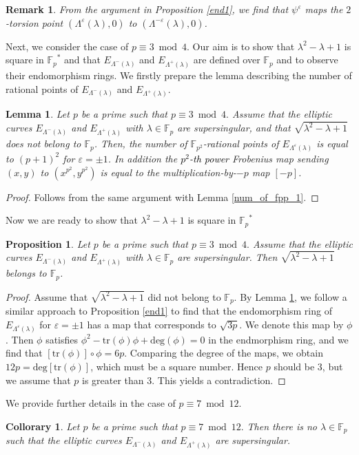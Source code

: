 \documentclass[a4paper, 11pt]{article}
\newtheorem{rem}[defn]{Remark}
\theoremstyle{plain}
\newtheorem{prop}[defn]{Proposition}
\newtheorem{lem}[defn]{Lemma}
\newtheorem{cor}[defn]{Collorary}
\newcommand{\?}{\textcolor{red}{??}}
\newcommand{\lm}{\lambda}
\newcommand{\Lm}{\Lambda}
\newcommand{\fp}{\mathbb{F}_p}
\begin{document}
\begin{rem}
\label{wheretomap}
    From the argument in Proposition \ref{end1}, we find that $\psi^\varepsilon$ maps the $2$-torsion point $(\Lambda^{\varepsilon}(\lm),0)$ to $({\Lambda^{-\varepsilon}(\lm)},0)$.
\end{rem}


Next, we consider the case of $p \equiv3 \bmod 4$. Our aim is to show that $\lm^2-\lm+1$ is square in ${\fp}^{*}$ and that $E_{\Lm^{-}(\lm)}$ and $E_{\Lm^{+}(\lm)}$ are defined over $\fp$ and to observe their endomorphism rings. We firstly prepare the lemma describing the number of rational points of $E_{\Lm^{-}(\lm)}$ and $E_{\Lm^{+}(\lm)}$.
\begin{lem}
\label{num_of_fpp_3}
Let $p$ be a prime such that $p \equiv 3 \bmod 4.$
Assume that the elliptic curves $ E_{\Lambda^{-}(\lm)}$ and $ E_{{\Lambda^{+}(\lm)}}$ with $\lm \in \fp$ are supersingular, and that $\sqrt{{\lm}^2-\lm+1}$ does not belong to $\fp$. Then, the number of $\mathbb{F}_{p^2}$-rational points of $E_{\Lm^{\varepsilon}(\lm)}$ is equal to $(p+1)^2$ for $\varepsilon=\pm1$. In addition the \textcolor{black}{${p^2}$-th power} Frobenius map sending $(x,y) $ to $(x^{p^2},y^{p^2})$ is equal to the multiplication-by-$-p$ map $[-p]$.
\end{lem}

\begin{proof}
    Follows from the same argument with Lemma \ref{num_of_fpp_1}.
\end{proof}

Now we are ready to show that $\lm^2-\lm+1$ is square in ${\fp}^{*}$
\begin{prop}
\label{pmod43fpcase}
    Let $p$ be a prime such that $p \equiv 3 \bmod 4.$ Assume that the elliptic curves $ E_{\Lambda^{-}(\lm)}$ and $ E_{{\Lambda^{+}(\lm)}}$ with $\lm\in\fp$ are supersingular. Then $\sqrt{{\lm}^2-\lm+1}$ belongs to $\fp$.
\end{prop}

\begin{proof}
    Assume that $\sqrt{{\lm}^2-\lm+1}$ did not belong to $\fp$. By Lemma \ref{num_of_fpp_3}, we follow a similar approach to Proposition \ref{end1} to find that the endomorphism ring of $ E_{\Lambda^{\varepsilon}(\lm)}$ for $\varepsilon=\pm1$ has a map that corresponds to $\sqrt{3p}$. We denote this map by $\phi$. Then $\phi$ satisfies ${\phi}^2-\text{tr}(\phi){\phi}+\text{deg}(\phi)=0$ in the endmorphism ring, and we find that $[\text{tr}(\phi)]\circ \phi=6p$. Comparing the degree of the maps, we obtain $12p=\text{deg}[\text{tr}(\phi)]$, which must be a square number. Hence $p$ should be $3$, but we assume that $p$ is greater than $3$. This yields a contradiction. 
\end{proof}
We provide further details in the case of $p\equiv7 \bmod 12$.
\begin{cor}
\label{peq7mod12}
    Let $p$ be a prime such that $p \equiv 7 \bmod 12.$ Then there is no $\lm \in \fp$  such that the elliptic curves $ E_{\Lambda^{-}(\lm)}$ and $ E_{{\Lambda^{+}(\lm)}}$ are supersingular.   
\end{cor}
\end{document}
